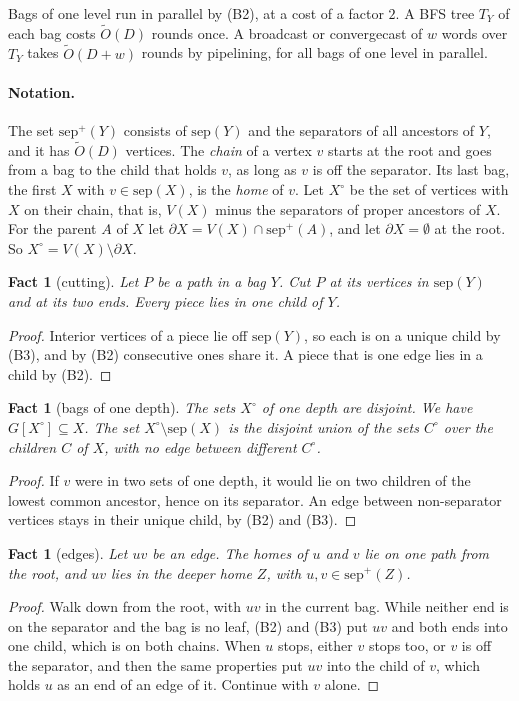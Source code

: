 \documentclass[11pt]{article}
\newtheorem{fact}[theorem]{Fact}
\theoremstyle{definition}
\theoremstyle{remark}
\theoremstyle{plain}
\newcommand{\Ot}{\tilde O}
\newcommand{\sep}{\mathrm{sep}}
\begin{document}
Bags of one level run in parallel by (B2), at a cost of a factor $2$. A BFS tree $T_Y$ of each bag
costs $\Ot(D)$ rounds once. A broadcast or convergecast of $w$ words over $T_Y$ takes $\Ot(D+w)$ rounds by
pipelining, for all bags of one level in parallel.

\paragraph{Notation.} The set $\sep^+(Y)$ consists of $\sep(Y)$ and the separators of all ancestors of
$Y$, and it has $\Ot(D)$ vertices. The \emph{chain} of a vertex $v$ starts at the root and goes from a
bag to the child that holds $v$, as long as $v$ is off the separator. Its last bag, the first $X$
with $v\in\sep(X)$, is the \emph{home} of $v$. Let $X^\circ$ be the set of vertices with $X$ on their
chain, that is, $V(X)$ minus the separators of proper ancestors of $X$. For the parent $A$ of $X$ let
$\partial X=V(X)\cap\sep^+(A)$, and let $\partial X=\emptyset$ at the root. So $X^\circ=V(X)\setminus\partial X$.

\begin{fact}[cutting]\label{fact:cut}
Let $P$ be a path in a bag $Y$. Cut $P$ at its vertices in $\sep(Y)$ and at its two ends. Every piece
lies in one child of $Y$.
\end{fact}
\begin{proof}
Interior vertices of a piece lie off $\sep(Y)$, so each is on a unique child by (B3), and by (B2)
consecutive ones share it. A piece that is one edge lies in a child by (B2).
\end{proof}

\begin{fact}[bags of one depth]\label{fact:depth}
The sets $X^\circ$ of one depth are disjoint. We have $G[X^\circ]\subseteq X$. The set $X^\circ\setminus\sep(X)$ is the
disjoint union of the sets $C^\circ$ over the children $C$ of $X$, with no edge between different $C^\circ$.
\end{fact}
\begin{proof}
If $v$ were in two sets of one depth, it would lie on two children of the lowest common ancestor, hence on its
separator. An edge between non-separator vertices stays in their unique child, by (B2) and (B3).
\end{proof}

\begin{fact}[edges]\label{fact:edge}
Let $uv$ be an edge. The homes of $u$ and $v$ lie on one path from the root, and $uv$ lies in the deeper
home $Z$, with $u,v\in\sep^+(Z)$.
\end{fact}
\begin{proof}
Walk down from the root, with $uv$ in the current bag. While neither end is on the separator and the bag is
no leaf, (B2) and (B3) put $uv$ and both ends into one child, which is on both chains. When $u$ stops, either
$v$ stops too, or $v$ is off the separator, and then the same properties put $uv$ into the child of $v$, which holds
$u$ as an end of an edge of it. Continue with $v$ alone.
\end{proof}
\end{document}
